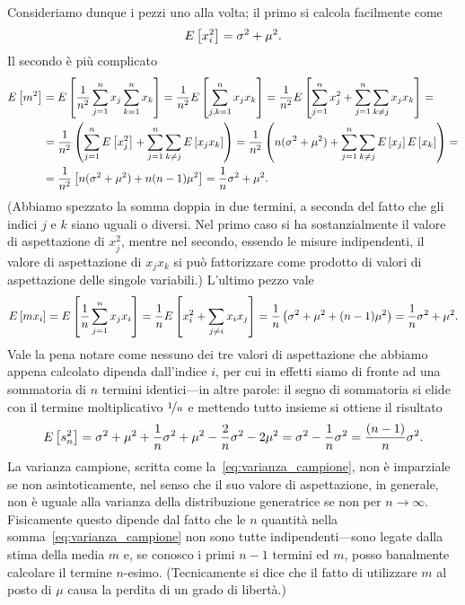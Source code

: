 Consideriamo dunque i pezzi uno alla volta; il primo si calcola facilmente come
\begin{align*}
  \displaystyle E\left[x_i^2\right] = \sigma^2 + \mu^2.
\end{align*}
Il secondo è più complicato
\begin{align*}
  \displaystyle E\left[m^2\right] & =
  \displaystyle E\left[\frac{1}{n^2}\sum_{j = 1}^n x_j\sum_{k = 1}^n x_k\right] =
  \frac{1}{n^2}\displaystyle E\left[\sum_{j,k = 1}^n x_jx_k\right] =
  \frac{1}{n^2}\displaystyle E\left[\sum_{j = 1}^nx_j^2 + \sum_{j = 1}^n\sum_{k \neq j}x_jx_k\right] =\\
  & = \frac{1}{n^2}\left( \sum_{j = 1}^n\displaystyle E\left[x_j^2\right] +
  \sum_{j = 1}^n\sum_{k \neq j} \displaystyle E\left[x_jx_k\right] \right) =
  \frac{1}{n^2}\left(n(\sigma^2 + \mu^2) +
  \sum_{j = 1}^n\sum_{k \neq j}\displaystyle E\left[x_j\right]\displaystyle E\left[x_k\right] \right) =\\
  & = \frac{1}{n^2}\left[ n(\sigma^2 + \mu^2) + n(n - 1)\mu^2 \right] =
  \frac{1}{n}\sigma^2 + \mu^2.
\end{align*}
(Abbiamo spezzato la somma doppia in due termini, a seconda del fatto che gli
indici $j$ e $k$ siano uguali o diversi. Nel primo caso si ha sostanzialmente
il valore di aspettazione di $x_j^2$, mentre nel secondo, essendo le misure
indipendenti, il valore di aspettazione di $x_jx_k$ si può fattorizzare come
prodotto di valori di aspettazione delle singole variabili.) L'ultimo pezzo
vale
\begin{align*}
  \displaystyle E\left[mx_i\right] = \displaystyle E\left[\frac{1}{n}\sum_{j = 1}^nx_jx_i\right] =
  \frac{1}{n} \displaystyle E\left[x_i^2 + \sum_{j \neq i} x_ix_j\right] =
  \frac{1}{n} \left( \sigma^2 + \mu^2 + (n - 1)\mu^2 \right) =
  \frac{1}{n}\sigma^2 + \mu^2.
\end{align*}
Vale la pena notare come nessuno dei tre valori di aspettazione che abbiamo
appena calcolato dipenda dall'indice $i$, per cui in effetti siamo di fronte
ad una sommatoria di $n$ termini identici---in altre parole: il segno di
sommatoria si elide con il termine moltiplicativo $\nicefrac{1}{n}$ e mettendo
tutto insieme si ottiene il risultato
\begin{align*}
  \displaystyle E\left[s^2_n\right] = \sigma^2 + \mu^2 + \frac{1}{n}\sigma^2 + \mu^2
  - \frac{2}{n}\sigma^2 - 2\mu^2 = \sigma^2 - \frac{1}{n}\sigma^2 =
  \frac{(n - 1)}{n}\sigma^2.
\end{align*}
La varianza campione, scritta come la~\eqref{eq:varianza_campione}, non
è imparziale se non asintoticamente, nel senso che il suo valore di
aspettazione, in generale, non è uguale alla varianza della distribuzione
generatrice se non per $n \rightarrow \infty$. Fisicamente questo dipende dal
fatto che le $n$ quantità nella somma~\eqref{eq:varianza_campione} non sono
tutte indipendenti---sono legate dalla stima della media $m$ e, se conosco
i primi $n - 1$ termini ed $m$, posso banalmente calcolare il termine
$n$-esimo. (Tecnicamente si dice che il fatto di utilizzare $m$ al posto di
$\mu$ causa la perdita di un grado di libertà.)


